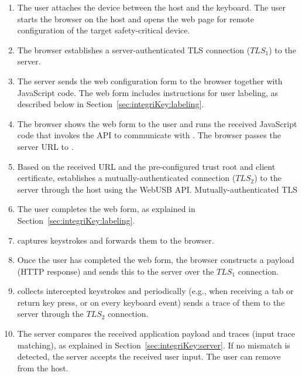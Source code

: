 \begin{enumerate}
    \item[\one] The user attaches the \device device between the host and the keyboard. The user starts the browser on the host and opens the web page for remote configuration of the target safety-critical device. 

    \item[\two] The browser establishes a server-authenticated TLS connection ($TLS_1$) to the server. 

    \item[\three] The server sends the web configuration form to the browser together with JavaScript code. The web form includes instructions for user labeling, as described below in Section~\ref{sec:integriKey:labeling}.
    
    \item[\four] The browser shows the web form to the user and runs the received JavaScript code that invokes the \webusb API to communicate with \device. The browser passes the server URL to \device.

    \item[\five] Based on the received URL and the pre-configured trust root and client certificate, \device establishes a mutually-authenticated \tls connection ($TLS_2$) to the server through the host using the WebUSB API. Mutually-authenticated TLS 

    \item[\six] The user completes the web form, as explained in Section~\ref{sec:integriKey:labeling}.
    
    \item[\seven] \device captures keystrokes and forwards them to the browser.
    
    \item[\eight] Once the user has completed the web form, the browser constructs a payload (HTTP response) and sends this to the server over the $TLS_1$ connection.
    
    \item[\nine] \device collects intercepted keystrokes and periodically (e.g., when receiving a tab or return key press, or on every keyboard event) sends a trace of them to the server through the $TLS_2$ connection. 

    \item[\ten] The server compares the received application payload and traces (input trace matching), as explained in Section~\ref{sec:integriKey:server}. If no mismatch is detected, the server accepts the received user input. The user can remove \device from the host.
\end{enumerate}

